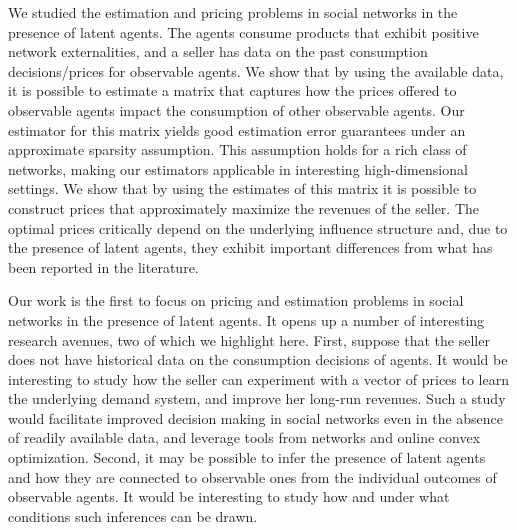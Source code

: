\documentclass[opre,nonblindrev]{informs3} %
\begin{document}
We studied  the estimation and pricing problems in  social networks in the presence of latent agents.
The agents consume products that exhibit positive network externalities, and a seller has data on the past consumption decisions/prices for observable agents. We show that by using the available data, 
it is possible to estimate
a matrix that captures how the prices offered to observable agents impact the consumption of other observable agents.
Our estimator for this matrix  yields good estimation error guarantees
under an approximate sparsity assumption. This assumption holds for a rich class of networks, making our estimators applicable in interesting high-dimensional settings.
We show that by using the estimates of this matrix it is possible to construct prices that approximately maximize the revenues of the seller.
The optimal prices critically depend on the underlying influence structure and,
due to the presence of latent agents, they
exhibit important differences from what has been reported in the literature.

Our work is the first to focus on pricing and estimation problems
in social networks
 in the presence of latent agents.
It opens up a number of interesting research avenues, two of which we highlight here.
First, suppose that the seller does not have historical data on the consumption decisions of agents.
It would be interesting to study  how the seller can experiment with a vector of prices to learn the underlying demand system, and
improve her long-run  revenues. Such a study would facilitate improved decision making in social networks even in the absence of readily available data, and leverage tools from networks and online convex optimization.
Second, 
it may be possible to
infer  the presence of latent agents
and how they are connected to observable ones
from the individual outcomes of
observable agents.
It 
would be interesting to study
how and under what conditions 
such inferences can be drawn.




\newpage


\end{document}
